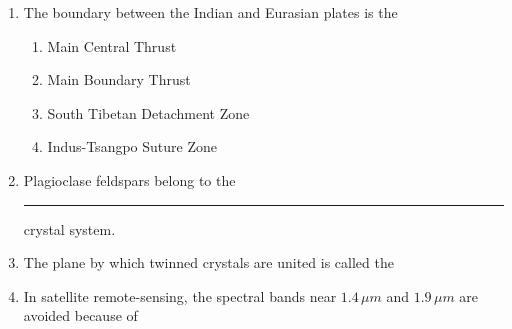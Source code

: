 \documentclass[12pt,fleqn]{article}
\theoremstyle{remark}
\begin{document}
\begin{enumerate}[label=Q.\arabic*.]
\begin {enumerate}
            \end{enumerate}
    \item The boundary between the Indian and Eurasian plates is the \hfill{} 
        \begin{enumerate}
                \item Main Central Thrust
                \item Main Boundary Thrust
                \item South Tibetan Detachment Zone
                \item Indus-Tsangpo Suture Zone                
            \end{enumerate}
    \item Plagioclase feldspars belong to the \rule{2.5cm}{0.15mm} crystal system. \hfill{} 
        \begin {enumerate}
            \end{enumerate}
    \item The plane by which twinned crystals are united is called the \hfill{} 
        \begin {enumerate}
            \end{enumerate}
    \item In satellite remote-sensing, the spectral bands near $1.4\,\mu m$ and $1.9\,\mu m$ are avoided because of \hfill{} 

\end{enumerate}
\end{document}
